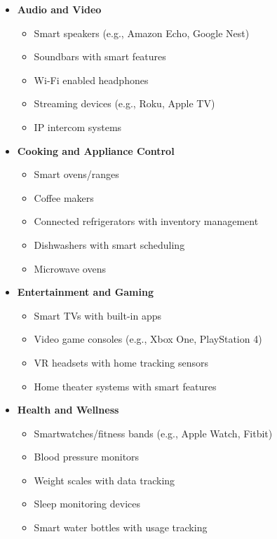 \documentclass[journal]{IEEEtran} %
\begin{document}
\begin{itemize}[]
    \item{\textbf{Audio and Video}}
        \begin{itemize}
            \item Smart speakers (e.g., Amazon Echo, Google Nest)
            \item Soundbars with smart features
            \item Wi-Fi enabled headphones
            \item Streaming devices (e.g., Roku, Apple TV)
            \item IP intercom systems
        \end{itemize}

    \item{\textbf{Cooking and Appliance Control}}
        \begin{itemize}
            \item Smart ovens/ranges
            \item Coffee makers
            \item Connected refrigerators with inventory management
            \item Dishwashers with smart scheduling
            \item Microwave ovens
        \end{itemize}

    \item{\textbf{Entertainment and Gaming}}
        \begin{itemize}
            \item Smart TVs with built-in apps
            \item Video game consoles (e.g., Xbox One, PlayStation 4)
            \item VR headsets with home tracking sensors
            \item Home theater systems with smart features
        \end{itemize}

    \item{\textbf{Health and Wellness}}
        \begin{itemize}
            \item Smartwatches/fitness bands (e.g., Apple Watch, Fitbit)
            \item Blood pressure monitors
            \item Weight scales with data tracking
            \item Sleep monitoring devices
            \item Smart water bottles with usage tracking
        \end{itemize}


\end{itemize}
\end{document}
